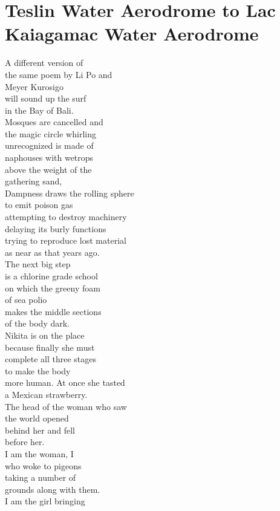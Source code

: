\documentclass[smalldemyvopaper,11pt,twoside,onecolumn,openright,extrafontsizes]{memoir}
\begin{document}
\chapter{Teslin Water Aerodrome to Lac Kaiagamac Water Aerodrome}
A different version of
\\the same poem by Li Po and
\\Meyer Kurosigo
\\will sound up the surf
\\in the Bay of Bali.
\\Mosques are cancelled and
\\the magic circle whirling
\\unrecognized is made of
\\naphouses with wetrops
\\above the weight of the
\\gathering sand,
\\Dampness draws the rolling sphere
\\to emit poison gas
\\attempting to destroy machinery
\\delaying its burly functions
\\trying to reproduce lost material
\\as near as that years ago.
\\The next big step
\\is a chlorine grade school
\\on which the greeny foam
\\of sea polio
\\makes the middle sections
\\of the body dark.
\\Nikita is on the place
\\because finally she must
\\complete all three stages
\\to make the body
\\more human. At once she tasted
\\a Mexican strawberry.
\\The head of the woman who saw
\\the world opened
\\behind her and fell
\\before her.
\\I am the woman, I
\\who woke to pigeons
\\taking a number of
\\grounds along with them.
\\I am the girl bringing
\end{document}
